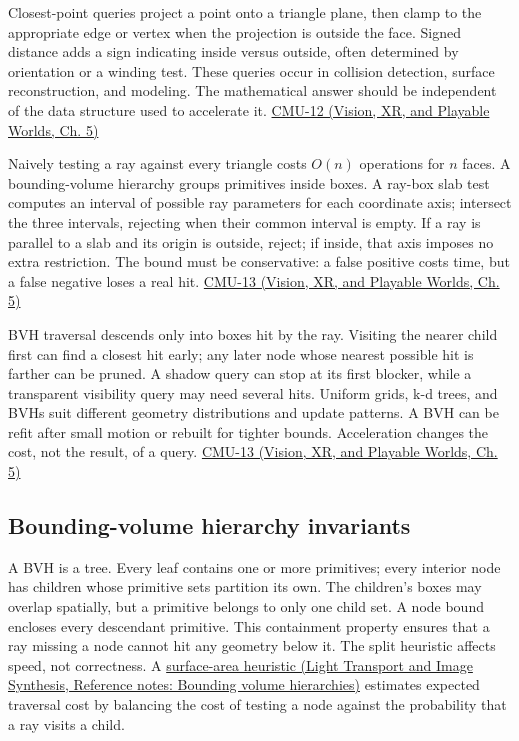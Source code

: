 Closest-point queries project a point onto a triangle plane, then clamp to the appropriate edge or vertex when the projection is outside the face. Signed distance adds a sign indicating inside versus outside, often determined by orientation or a winding test. These queries occur in collision detection, surface reconstruction, and modeling. The mathematical answer should be independent of the data structure used to accelerate it. \href{../07-Vision-XR-and-Playable-Worlds/main.pdf\#nameddest=04-visual-computing-ii-ch036-cmu-12---geometric-queries}{CMU-12 (Vision, XR, and Playable Worlds, Ch. 5)}

Naively testing a ray against every triangle costs \(O(n)\) operations for \(n\) faces. A bounding-volume hierarchy groups primitives inside boxes. A ray-box slab test computes an interval of possible ray parameters for each coordinate axis; intersect the three intervals, rejecting when their common interval is empty. If a ray is parallel to a slab and its origin is outside, reject; if inside, that axis imposes no extra restriction. The bound must be conservative: a false positive costs time, but a false negative loses a real hit. \href{../07-Vision-XR-and-Playable-Worlds/main.pdf\#nameddest=04-visual-computing-ii-ch036-cmu-13---spatial-data-structures}{CMU-13 (Vision, XR, and Playable Worlds, Ch. 5)}

BVH traversal descends only into boxes hit by the ray. Visiting the nearer child first can find a closest hit early; any later node whose nearest possible hit is farther can be pruned. A shadow query can stop at its first blocker, while a transparent visibility query may need several hits. Uniform grids, k-d trees, and BVHs suit different geometry distributions and update patterns. A BVH can be refit after small motion or rebuilt for tighter bounds. Acceleration changes the cost, not the result, of a query. \href{../07-Vision-XR-and-Playable-Worlds/main.pdf\#nameddest=04-visual-computing-ii-ch036-cmu-13---spatial-data-structures}{CMU-13 (Vision, XR, and Playable Worlds, Ch. 5)}

\subsection{Bounding-volume hierarchy invariants}\label{04-visual-computing-ii-ch029-bounding-volume-hierarchy-invariants}

A BVH is a tree. Every leaf contains one or more primitives; every interior node has children whose primitive sets partition its own. The children's boxes may overlap spatially, but a primitive belongs to only one child set. A node bound encloses every descendant primitive. This containment property ensures that a ray missing a node cannot hit any geometry below it. The split heuristic affects speed, not correctness. A \href{../04-Light-Transport-and-Image-Synthesis/main.pdf\#nameddest=appendix-0b426c47dd78}{surface-area heuristic (Light Transport and Image Synthesis, Reference notes: Bounding volume hierarchies)} estimates expected traversal cost by balancing the cost of testing a node against the probability that a ray visits a child.

